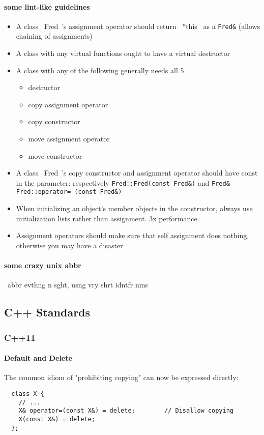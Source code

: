 \paragraph{some lint-like guidelines}
\begin{itemize}
\item A class ~Fred~’s assignment operator should return ~*this~ as a
  \verb$Fred&$ (allows chaining of assignments)
\item A class with any virtual functions ought to have a virtual
  destructor
\item A class with any of the following generally needs all 5
  \begin{itemize}
  \item destructor
  \item copy assignment operator
  \item copy constructor
  \item move assignment operator
  \item move constructor
  \end{itemize}
\item A class ~Fred~’s copy constructor and assignment operator should
  have const in the parameter: respectively
  \verb$Fred::Fred(const Fred&)$ and
  \verb$Fred& Fred::operator= (const Fred&)$
\item When initializing an object’s member objects in the constructor,
  always use initialization lists rather than assignment. 3x
  performance.
\item Assignment operators should make sure that self assignment does
  nothing, otherwise you may have a disaster
\end{itemize}

\paragraph{some crazy unix abbr}
 ~abbr evthng n sght, usng vry shrt idntfr nms~

\subsection{C++ Standards}
\subsubsection{C++11}
\paragraph{Default and Delete}
The common idiom of "prohibiting copying" can now be expressed directly:
\begin{lstlisting}
  class X {
    // ...
    X& operator=(const X&) = delete;        // Disallow copying
    X(const X&) = delete;
  };
\end{lstlisting}

